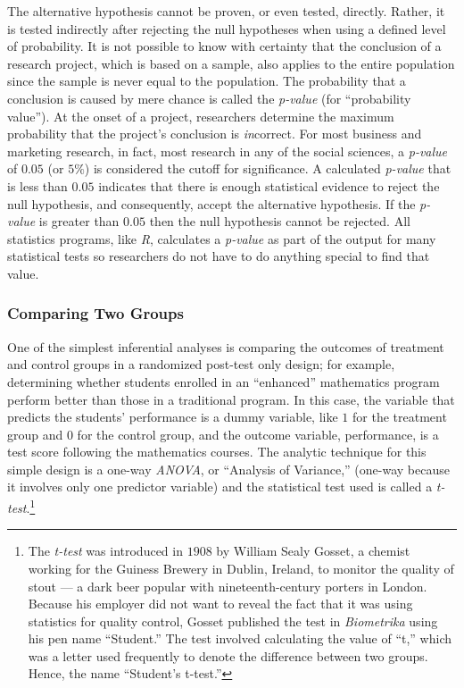 The alternative hypothesis cannot be proven, or even tested, directly. Rather, it is tested indirectly after rejecting the null hypotheses when using a defined level of probability. It is not possible to know with certainty that the conclusion of a research project, which is based on a sample, also applies to the entire population since the sample is never equal to the population. The probability that a conclusion is caused by mere chance is called the \textit{p-value} (for ``probability value''). At the onset of a project, researchers determine the maximum probability that the project's conclusion is \textit{in}correct. For most business and marketing research, in fact, most research in any of the social sciences, a \textit{p-value} of $ 0.05 $ (or $ 5\% $) is considered the cutoff for significance. A calculated \textit{p-value} that is less than $ 0.05 $ indicates that there is enough statistical evidence to reject the null hypothesis, and consequently, accept the alternative hypothesis. If the \textit{p-value} is greater than $ 0.05 $ then the null hypothesis cannot be rejected. All statistics programs, like \textit{R}, calculates a \textit{p-value} as part of the output for many statistical tests so researchers do not have to do anything special to find that value.

\subsubsection{Comparing Two Groups}

One of the simplest inferential analyses is comparing the outcomes of treatment and control groups in a randomized post-test only design; for example, determining whether students enrolled in an ``enhanced'' mathematics program perform better than those in a traditional program. In this case, the variable that predicts the students' performance is a dummy variable, like $ 1 $ for the treatment group and $ 0 $ for the control group, and the outcome variable, performance, is a test score following the mathematics courses. The analytic technique for this simple design is a one-way \textit{ANOVA}, or ``Analysis of Variance,'' (one-way because it involves only one predictor variable) and the statistical test used is called a \textit{t-test}.\footnote{The \textit{t-test} was introduced in $ 1908 $ by William Sealy Gosset, a chemist working for the Guiness Brewery in Dublin, Ireland, to monitor the quality of stout --- a dark beer popular with nineteenth-century porters in London. Because his employer did not want to reveal the fact that it was using statistics for quality control, Gosset published the test in \textit{Biometrika} using his pen name ``Student.'' The test involved calculating the value of ``t,'' which was a letter used frequently to denote the difference between two groups. Hence, the name ``Student's t-test.''}

